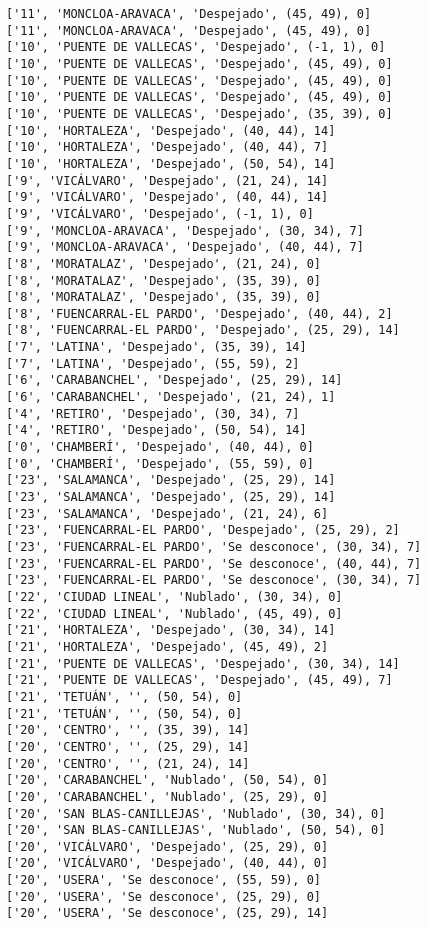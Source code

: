 \documentclass[11pt]{article}
\begin{document}
\begin{Verbatim}[commandchars=\\\{\}]
['11', 'MONCLOA-ARAVACA', 'Despejado', (45, 49), 0]
['11', 'MONCLOA-ARAVACA', 'Despejado', (45, 49), 0]
['10', 'PUENTE DE VALLECAS', 'Despejado', (-1, 1), 0]
['10', 'PUENTE DE VALLECAS', 'Despejado', (45, 49), 0]
['10', 'PUENTE DE VALLECAS', 'Despejado', (45, 49), 0]
['10', 'PUENTE DE VALLECAS', 'Despejado', (45, 49), 0]
['10', 'PUENTE DE VALLECAS', 'Despejado', (35, 39), 0]
['10', 'HORTALEZA', 'Despejado', (40, 44), 14]
['10', 'HORTALEZA', 'Despejado', (40, 44), 7]
['10', 'HORTALEZA', 'Despejado', (50, 54), 14]
['9', 'VICÁLVARO', 'Despejado', (21, 24), 14]
['9', 'VICÁLVARO', 'Despejado', (40, 44), 14]
['9', 'VICÁLVARO', 'Despejado', (-1, 1), 0]
['9', 'MONCLOA-ARAVACA', 'Despejado', (30, 34), 7]
['9', 'MONCLOA-ARAVACA', 'Despejado', (40, 44), 7]
['8', 'MORATALAZ', 'Despejado', (21, 24), 0]
['8', 'MORATALAZ', 'Despejado', (35, 39), 0]
['8', 'MORATALAZ', 'Despejado', (35, 39), 0]
['8', 'FUENCARRAL-EL PARDO', 'Despejado', (40, 44), 2]
['8', 'FUENCARRAL-EL PARDO', 'Despejado', (25, 29), 14]
['7', 'LATINA', 'Despejado', (35, 39), 14]
['7', 'LATINA', 'Despejado', (55, 59), 2]
['6', 'CARABANCHEL', 'Despejado', (25, 29), 14]
['6', 'CARABANCHEL', 'Despejado', (21, 24), 1]
['4', 'RETIRO', 'Despejado', (30, 34), 7]
['4', 'RETIRO', 'Despejado', (50, 54), 14]
['0', 'CHAMBERÍ', 'Despejado', (40, 44), 0]
['0', 'CHAMBERÍ', 'Despejado', (55, 59), 0]
['23', 'SALAMANCA', 'Despejado', (25, 29), 14]
['23', 'SALAMANCA', 'Despejado', (25, 29), 14]
['23', 'SALAMANCA', 'Despejado', (21, 24), 6]
['23', 'FUENCARRAL-EL PARDO', 'Despejado', (25, 29), 2]
['23', 'FUENCARRAL-EL PARDO', 'Se desconoce', (30, 34), 7]
['23', 'FUENCARRAL-EL PARDO', 'Se desconoce', (40, 44), 7]
['23', 'FUENCARRAL-EL PARDO', 'Se desconoce', (30, 34), 7]
['22', 'CIUDAD LINEAL', 'Nublado', (30, 34), 0]
['22', 'CIUDAD LINEAL', 'Nublado', (45, 49), 0]
['21', 'HORTALEZA', 'Despejado', (30, 34), 14]
['21', 'HORTALEZA', 'Despejado', (45, 49), 2]
['21', 'PUENTE DE VALLECAS', 'Despejado', (30, 34), 14]
['21', 'PUENTE DE VALLECAS', 'Despejado', (45, 49), 7]
['21', 'TETUÁN', '', (50, 54), 0]
['21', 'TETUÁN', '', (50, 54), 0]
['20', 'CENTRO', '', (35, 39), 14]
['20', 'CENTRO', '', (25, 29), 14]
['20', 'CENTRO', '', (21, 24), 14]
['20', 'CARABANCHEL', 'Nublado', (50, 54), 0]
['20', 'CARABANCHEL', 'Nublado', (25, 29), 0]
['20', 'SAN BLAS-CANILLEJAS', 'Nublado', (30, 34), 0]
['20', 'SAN BLAS-CANILLEJAS', 'Nublado', (50, 54), 0]
['20', 'VICÁLVARO', 'Despejado', (25, 29), 0]
['20', 'VICÁLVARO', 'Despejado', (40, 44), 0]
['20', 'USERA', 'Se desconoce', (55, 59), 0]
['20', 'USERA', 'Se desconoce', (25, 29), 0]
['20', 'USERA', 'Se desconoce', (25, 29), 14]

\end{Verbatim}
\end{document}
